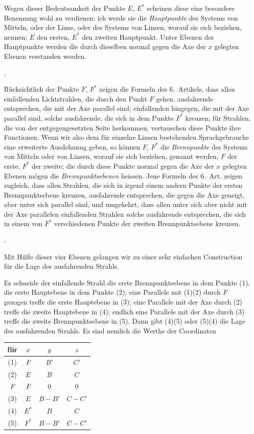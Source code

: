 \documentclass[11pt,a4paper]{article}
\begin{document}
Wegen dieser Bedeutsamkeit der Punkte $E$, $E^*$ scheinen diese eine besondere Benennung wohl zu verdienen: ich werde sie die \textit{Hauptpunkte} des Systems von Mitteln, oder der Linse, oder des Systems von Linsen, worauf sie sich beziehen, nennen; $E$ den ersten, $E^*$ den zweiten Hauptpunkt. Unter Ebenen der Hauptpunkte werden die durch dieselben normal gegen die Axe der $x$ gelegten Ebenen verstanden werden.

\bigskip{}.

\smallskip
Rücksichtlich der Punkte $F$, $F^*$ zeigen die Formeln des 6.~Artikels, dass allen einfallenden Lichtstrahlen, die durch den Punkt $F$ gehen, ausfahrende entsprechen, die mit der Axe parallel sind; einfallenden hingegen, die mit der Axe parallel sind, solche ausfahrende, die sich in dem Punkte $F^*$ kreuzen; für Strahlen, die von der entgegengesetzten Seite herkommen, vertauschen diese Punkte ihre Functionen. Wenn wir also dem für einzelne Linsen bestehenden Sprachgebrauche eine erweiterte Ausdehnung geben, so können $F$, $F^*$ die \textit{Brennpunkte} des Systems von Mitteln oder von Linsen, worauf sie sich beziehen, genannt werden, $F$ der erste, $F^*$ der zweite; die durch diese Punkte normal gegen die Axe der $x$ gelegten Ebenen mögen die \textit{Brennpunktsebenen} heissen. Jene Formeln des 6.~Art. zeigen zugleich, dass allen Strahlen, die sich in irgend einem andern Punkte der ersten Brennpunktsebene kreuzen, ausfahrende entsprechen, die gegen die Axe geneigt, aber unter sich parallel sind, und umgekehrt, dass allen unter sich aber nicht mit der Axe parallelen einfallenden Strahlen solche ausfahrende entsprechen, die sich in einem von $F^*$ verschiedenen Punkte der zweiten Brennpunktsebene kreuzen.

\newpage
{}.

\smallskip
Mit Hülfe dieser vier Ebenen gelangen wir zu einer sehr einfachen Construction für die Lage des ausfahrenden Strahls.

Es schneide der einfallende Strahl die erste Brennpunktsebene in dem Punkte (1), die erste Hauptebene in dem Punkte (2); eine Parallele mit (1)(2) durch $F$ gezogen treffe die erste Hauptebene in (3); eine Parallele mit der Axe durch (2) treffe die zweite Hauptebene in (4); endlich eine Parallele mit der Axe durch (3) treffe die zweite Brennpunktsebene in (5). Dann gibt (4)(5) oder (5)(4) die Lage des ausfahrenden Strahls. Es sind nemlich die Werthe der Coordinaten

\begin{center}
\begin{tabular}{c||c|c|c}
für & $x$ & $y$ & $z$ \\
\hline
(1) & $F$ & $B'$ & $C'$ \\
(2) & $E$ & $B$ & $C$ \\
$F$ & $F$ & $0$ & $0$ \\
(3) & $E$ & $B-B'$ & $C-C'$ \\
(4) & $E^*$ & $B$ & $C$ \\
(5) & $F^*$ & $B-B'$ & $C-C'$
\end{tabular}
\end{center}
\end{document}
